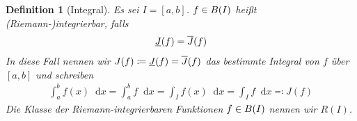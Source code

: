 \documentclass[11pt, twoside, a4paper]{article}
\theoremstyle{plain}
\newtheorem{definition}[blockelement]{Definition}
\newcommand{\of}[1]{\mathopen{}\mathclose{}\bgroup\left(#1\aftergroup\egroup\right)}
\newcommand{\interv}[1]{\left[#1\right]}
\newcommand{\definedas}[0]{\coloneqq}
\newcommand{\definedasbackwards}[0]{\eqqcolon}
\newcommand{\dif}{\mathop{}\!\mathrm{d}}
\begin{document}
    \begin{definition}[Integral]
        Es sei $I=\interv{a,b}$. $f\in B\of{I}$ heißt (Riemann-)integrierbar, falls
        \begin{align*}
            \underline{J}\of{f} = \overline{J}\of{f}
        \end{align*}
        In diese Fall nennen wir $J(f) \definedas \underline{J}\of{f} = \overline{J}\of{f}$ das bestimmte Integral von $f$ über $\interv{a,b}$ und schreiben
        \begin{align*}
            \int_{a}^{b} f(x) \dif x = \int_{a}^{b} f\dif x = \int_{I} f(x)\dif x = \int_{I} f\dif x \definedasbackwards J(f)
        \end{align*}
        Die Klasse der Riemann-integrierbaren Funktionen $f\in B\of{I}$ nennen wir $R(I)$.
    \end{definition}
\end{document}
